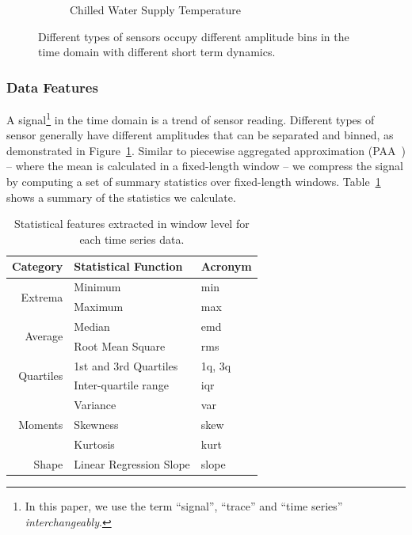\begin{figure}[ht!]
\begin{subfigure}{0.32\textwidth}
                \caption{Chilled Water Supply Temperature}
  \end{subfigure}
\caption{Different types of sensors occupy different amplitude bins in the time domain with different short term dynamics.}
\label{fig:example}
\end{figure}

\subsubsection{Data Features}
A signal\footnote{In this paper, we use the term ``signal'', ``trace'' and ``time series'' \textit{interchangeably}.} in the time domain is a trend of sensor reading. 
Different types of sensor generally have different amplitudes that can be separated and binned,  
as demonstrated in Figure~\ref{fig:example}. 
Similar to piecewise aggregated approximation (PAA~\cite{paa}) -- where the mean is calculated in a fixed-length window -- 
we compress the signal by computing a set of summary statistics over fixed-length windows. 
Table~\ref{table:fd} shows a summary of the statistics we calculate.


\begin{table}[h]
\centering
\begin{tabular}{r|l|l}
\hline
Category                   & Statistical Function & \multicolumn{1}{l}{Acronym} \\ \hline\hline
\multirow{2}{*}{Extrema}   & Minimum                 & min                          \\ \cline{3-3} 
                           & Maximum                 & max                          \\ \hline
\multirow{2}{*}{Average}   & Median                  & emd                          \\ \cline{3-3} 
                           & Root Mean Square        & rms                          \\ \hline
\multirow{2}{*}{Quartiles} & 1st and 3rd Quartiles   & 1q, 3q                       \\ \cline{3-3} 
                           & Inter-quartile range    & iqr                          \\ \hline
\multirow{3}{*}{Moments}   & Variance                & var                          \\ \cline{3-3} 
                           & Skewness                & skew                         \\ \cline{3-3} 
                           & Kurtosis                & kurt                         \\ \hline
Shape                      & Linear Regression Slope & slope                        \\ \hline
\end{tabular}
\caption{Statistical features extracted in window level for each time series data.}
\label{table:fd}
\end{table}

